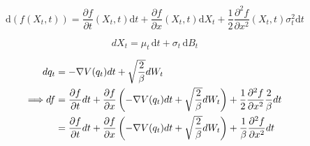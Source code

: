 $$
\mathrm{d}(f(X_t,t)) = \frac{\partial f}{\partial t}(X_t,t)\mathrm{d}t
+ \frac{\partial f}{\partial x}(X_t,t)\mathrm{d}X_t
+ \frac{1}{2}\frac{\partial^2 f}{\partial x^2}(X_t,t)\sigma_t^2\mathrm{d}t
$$

$$
    dX_t= \mu_t\,\mathrm{d}t + \sigma_t\,\mathrm{d}B_t
$$

\begin{align}
    dq_t &= -\nabla V(q_t) dt + \sqrt{\frac{2}{\beta}} dW_t \\
    \implique df &= \frac{\partial f}{\partial t}dt
    + \frac{\partial f}{\partial x}
    \left( -\nabla V(q_t) dt + \sqrt{\frac{2}{\beta}} dW_t \right)
    + \ud \frac{\partial^2 f}{\partial x^2}   \frac{2}{\beta} dt \\
%
    &= \frac{\partial f}{\partial t}dt
    + \frac{\partial f}{\partial x}
    \left( -\nabla V(q_t) dt + \sqrt{\frac{2}{\beta}} dW_t \right)
    + \frac{1}{\beta} \frac{\partial^2 f}{\partial x^2} dt \\
\end{align}
